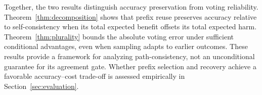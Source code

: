 Together, the two results distinguish accuracy preservation from voting reliability. Theorem~\ref{thm:decomposition} shows that prefix reuse preserves accuracy relative to self-consistency when its total expected benefit offsets its total expected harm. Theorem~\ref{thm:plurality} bounds the absolute voting error under sufficient conditional advantages, even when sampling adapts to earlier outcomes. These results provide a framework for analyzing path-consistency, not an unconditional guarantee for its agreement gate. Whether prefix selection and recovery achieve a favorable accuracy--cost trade-off is assessed empirically in Section~\ref{sec:evaluation}.
